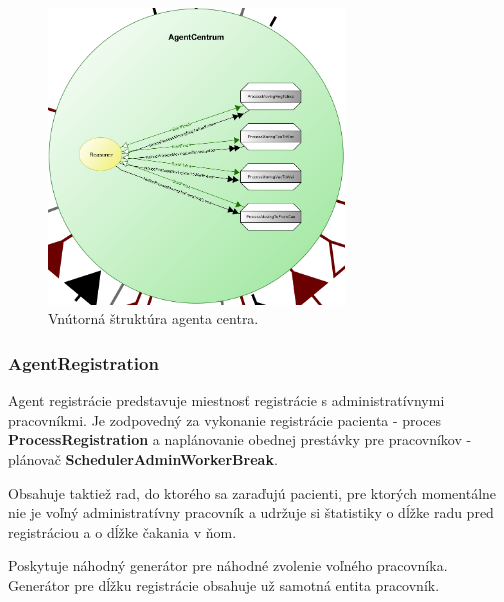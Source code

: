 \documentclass[letterpaper]{article}
\begin{document}
	\vspace{0.8cm}
	
	\begin{figure}[hbt!]
		\centering
		\includegraphics[width=0.7\textwidth]{src/AgentCentrum}
		\caption{Vnútorná štruktúra agenta centra.}
	\end{figure}
	
	\newpage
	
	\subsubsection{AgentRegistration}
	
	Agent registrácie predstavuje miestnosť registrácie s administratívnymi pracovníkmi. Je zodpovedný za vykonanie registrácie pacienta - proces \textbf{ProcessRegistration} a naplánovanie obednej prestávky pre pracovníkov - plánovač \textbf{SchedulerAdminWorkerBreak}. 
	
	Obsahuje taktiež rad, do ktorého sa zaraďujú pacienti, pre ktorých momentálne nie je voľný administratívny pracovník a udržuje si štatistiky o dĺžke radu pred registráciou a o dĺžke čakania v ňom.
	
	Poskytuje náhodný generátor pre náhodné zvolenie voľného pracovníka. Generátor pre dĺžku registrácie obsahuje už samotná entita pracovník.
	
	\vspace{0.8cm}
	
\end{document}
